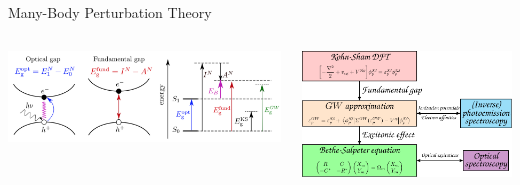 \documentclass[aspectratio=169,9pt]{beamer}
\begin{document}
\begin{frame}{Many-Body Perturbation Theory}

        \begin{columns}
                \begin{column}{0.55\textwidth}
                        \centering
                        \includegraphics[width=1.05\textwidth]{fig/gaps}
                \end{column}
                \begin{column}{0.45\textwidth}
                        \includegraphics[width=1.00\textwidth]{fig/TOC_BSE-GW}
                \end{column}
        \end{columns}


\end{frame}
\end{document}

